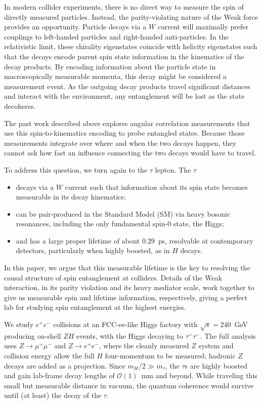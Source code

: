 \documentclass[%
 reprint,
 amsmath,amssymb,
 aps
]{revtex4-2}
\begin{document}
In modern collider experiments, there is no direct way to measure the spin of directly measured particles. Instead, the parity-violating nature of the Weak force provides an opportunity. Particle decays via a $W$ current will maximally prefer couplings to left-handed particles and right-handed anti-particles. In the relativistic limit, these chirality eigenstates coincide with helicity eigenstates such that the decays encode parent spin state information in the kinematics of the decay products. By encoding information about the particle state in macroscopically measurable momenta, this decay might be considered a measurement event. As the outgoing decay products travel significant distances and interact with the environment, any entanglement will be lost as the state decoheres.

The past work described above explores angular correlation measurements that use this spin-to-kinematics encoding to probe entangled states. Because those measurements integrate over where and when the two decays happen, they cannot ask how fast an influence connecting the two decays would have to travel.

To address this question, we turn again to the $\tau$ lepton. The $\tau$

\begin{itemize}
    \item decays via a $W$ current such that information about its spin state becomes measurable in its decay kinematics;
    \item can be pair-produced in the Standard Model (SM) via heavy bosonic resonances, including the only fundamental spin-0 state, the Higgs;
    \item and has a large proper lifetime of about $0.29$~ps, resolvable at contemporary detectors, particularly when highly boosted, as in $H$ decays.
\end{itemize}

\noindent In this paper, we argue that this measurable lifetime is the key to resolving the causal structure of spin entanglement at colliders. Details of the Weak interaction, in its parity violation and its heavy mediator scale, work together to give us measurable spin and lifetime information, respectively, giving a perfect lab for studying spin entanglement at the highest energies.

We study $e^+ e^-$ collisions at an FCC-ee-like Higgs factory with $\sqrt{s}=240$~GeV producing on-shell $ZH$ events, with the Higgs decaying to $\tau^+ \tau^-$. The full analysis uses $Z\to\mu^+\mu^-$ and $Z\to e^+e^-$, where the cleanly measured $Z$ system and collision energy allow the full $H$ four-momentum to be measured; hadronic $Z$ decays are added as a projection. Since $m_H/2\gg m_\tau$, the $\tau$s are highly boosted and gain lab-frame decay lengths of $\mathcal{O}(1)$~mm and beyond. While traveling this small but measurable distance in vacuum, the quantum coherence would survive until (at least) the decay of the $\tau$.
\end{document}
